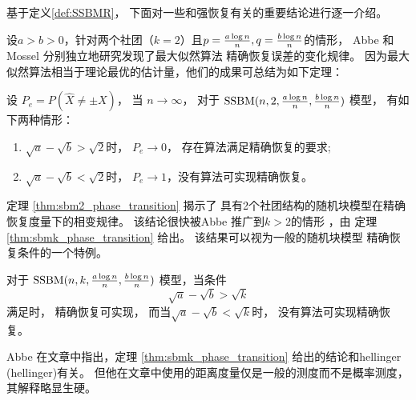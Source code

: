 基于定义\ref{def:SSBMR}，
下面对一些和强恢复有关的重要结论进行逐一介绍。

设$a>b>0$，针对两个社团（$k=2$）且$p=\frac{a \log n}{n},q=\frac{b \log n}{n}$的情形，
Abbe \cite{abbe2015exact} 和 Mossel
\cite{mossel2016} 分别独立地研究发现了最大似然算法
精确恢复误差的变化规律。
因为最大似然算法相当于理论最优的估计量，他们的成果可总结为如下定理：
\begin{theorem}\label{thm:sbm2_phase_transition}
设 $P_e=P(\hat{X} \neq \pm X)$， 当 $n \to \infty$，
对于 $\operatorname{SSBM}(n,2,\frac{a \log n}{n}, \frac{b \log n}{n})$ 模型，
有如下两种情形：
	\begin{enumerate}
		\item $\sqrt{a} - \sqrt{b} > \sqrt{2}$时，
    $P_e \to 0$， 存在算法满足精确恢复的要求;
		\item $\sqrt{a} - \sqrt{b} < \sqrt{2}$时，
    $P_e \to 1$，没有算法可实现精确恢复。
	\end{enumerate}
\end{theorem}
定理 \ref{thm:sbm2_phase_transition} 揭示了
具有2个社团结构的随机块模型在精确恢复度量下的相变规律。
该结论很快被Abbe 推广到$k>2$的情形
\cite{abbe2015community}，由
定理 \ref{thm:sbmk_phase_transition} 给出。
该结果可以视为一般的随机块模型
精确恢复条件的一个特例。

\begin{theorem}\label{thm:sbmk_phase_transition}
  对于 $\operatorname{SSBM}(n,k,\frac{a \log n}{n}, \frac{b \log n}{n})$ 模型，当条件
  \begin{equation}\label{eq:abk}
    \sqrt{a} - \sqrt{b} > \sqrt{k}
  \end{equation}   
  满足时，
  精确恢复可实现，
  而当$\sqrt{a} - \sqrt{b} < \sqrt{k}$时，
  没有算法可实现精确恢复。
\end{theorem}
\begin{remark}
  Abbe 在文章中指出，定理 \ref{thm:sbmk_phase_transition} 
  给出的结论和\gls{hellinger} (\glsdesc{hellinger})有关。
  但他在文章中使用的距离度量仅是一般的测度而不是概率测度，
  其解释略显生硬。
\end{remark}

